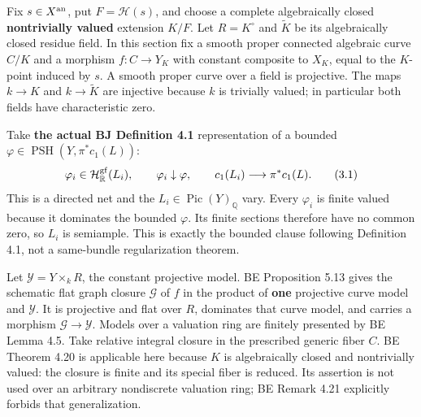 \documentclass[
  10pt,
]{article}
\begin{document}
Fix \(s\in X^{\rm an}\), put \(F=\mathscr H(s)\), and choose a complete
algebraically closed \textbf{nontrivially valued} extension \(K/F\). Let
\(R=K^\circ\) and \(\widetilde K\) be its algebraically closed residue
field. In this section fix a smooth proper connected algebraic curve
\(C/K\) and a morphism \(f:C\to Y_K\) with constant composite to
\(X_K\), equal to the \(K\)-point induced by \(s\). A smooth proper
curve over a field is projective. The maps \(k\to K\) and
\(k\to\widetilde K\) are injective because \(k\) is trivially valued; in
particular both fields have characteristic zero.

Take \textbf{the actual BJ Definition 4.1} representation of a bounded
\(\varphi\in\operatorname{PSH}(Y,\pi^*c_1(L))\):
\[\varphi_i\in\mathcal H_{\mathbb R}^{\rm gf}(L_i),\qquad
\varphi_i\downarrow\varphi,\qquad c_1(L_i)\longrightarrow\pi^*c_1(L).       \tag{3.1}\]
This is a directed net and the \(L_i\in\operatorname{Pic}(Y)_\mathbb Q\)
vary. Every \(\varphi_i\) is finite valued because it dominates the
bounded \(\varphi\). Its finite sections therefore have no common zero,
so \(L_i\) is semiample. This is exactly the bounded clause following
Definition 4.1, not a same-bundle regularization theorem.

Let \(\mathcal Y=Y\times_k R\), the constant projective model. BE
Proposition 5.13 gives the schematic flat graph closure \(\mathcal G\)
of \(f\) in the product of \textbf{one} projective curve model and
\(\mathcal Y\). It is projective and flat over \(R\), dominates that
curve model, and carries a morphism \(\mathcal G\to\mathcal Y\). Models
over a valuation ring are finitely presented by BE Lemma 4.5. Take
relative integral closure in the prescribed generic fiber \(C\). BE
Theorem 4.20 is applicable here because \(K\) is algebraically closed
and nontrivially valued: the closure is finite and its special fiber is
reduced. Its assertion is not used over an arbitrary nondiscrete
valuation ring; BE Remark 4.21 explicitly forbids that generalization.
\end{document}
